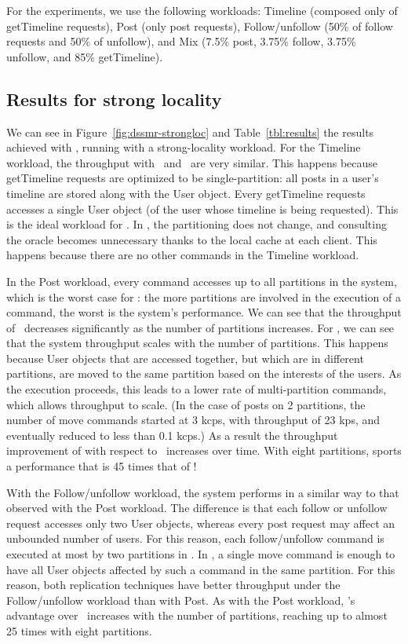 For the experiments, we use the following workloads: Timeline (composed only of
getTimeline requests), Post (only post requests), Follow/unfollow (50\% of
follow requests and 50\% of unfollow), and Mix (7.5\% post, 3.75\% follow,
3.75\% unfollow, and 85\% getTimeline).

\subsection{Results for strong locality}
\label{sec:dssmr-evaluation:strongloc}


We can see in Figure~\ref{fig:dssmr-strongloc} and Table~\ref{tbl:results} the
results achieved with \dssmrappname{}, running with a strong-locality workload.
For the Timeline workload, the throughput with \dssmr\ and \ssmr\ are very
similar. This happens because getTimeline requests are optimized to be
single-partition: all posts in a user's timeline are stored along with the User
object. Every getTimeline requests accesses a single User object (of the user
whose timeline is being requested). This is the ideal workload for \ssmr{}. In
\dssmr{}, the partitioning does not change, and consulting the oracle becomes
unnecessary thanks to the local cache at each client. This happens because there
are no other commands in the Timeline workload.

In the Post workload, every command accesses up to all partitions in the system,
which is the worst case for \ssmr{}: the more partitions are involved in the
execution of a command, the worst is the system's performance. We can see that
the throughput of \ssmr\ decreases significantly as the number of partitions
increases. For \dssmr{}, we can see that the system throughput scales with the
number of partitions. This happens because User objects that are accessed
together, but which are in different partitions, are moved to the same partition
based on the interests of the users. As the execution proceeds, this leads to a
lower rate of multi-partition commands, which allows throughput to scale. (In
the case of posts on 2 partitions, the number of move commands started at 3
kcps, with throughput of 23 kps, and eventually reduced to less than 0.1 kcps.)
As a result the throughput improvement of \dssmr{} with respect to \ssmr\
increases over time. With eight partitions, \dssmr{} sports a performance that
is 45 times that of \ssmr!

With the Follow/unfollow workload, the system performs in a similar way to that
observed with the Post workload. The difference is that each follow or unfollow
request accesses only two User objects, whereas every post request may affect an
unbounded number of users. For this reason, each follow/unfollow command is
executed at most by two partitions in \ssmr{}. In \dssmr{}, a single move
command is enough to have all User objects affected by such a command in the
same partition. For this reason, both replication techniques have better
throughput under the Follow/unfollow workload than with Post. As with the Post
workload, \dssmr{}'s advantage over \ssmr\ increases with the number of
partitions, reaching up to almost 25 times with eight partitions.

